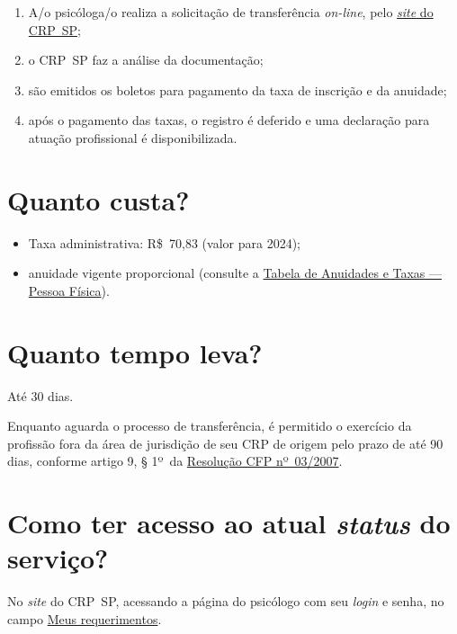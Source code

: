 \begin{enumerate}
	\item
	A/o psicóloga/o realiza a solicitação de transferência \emph{on-line}, pelo \href{https://www.crpsp.org/pagina/view/337}{\emph{site} do CRP~SP};
	\item
	o CRP~SP faz a análise da documentação;
	\item
	são emitidos os boletos para pagamento da taxa de inscrição e da anuidade;
	\item
	após o pagamento das taxas, o registro é deferido e uma declaração para atuação profissional é disponibilizada.
\end{enumerate}

\section{Quanto custa?}

\begin{itemize}
	\item
	Taxa administrativa: R\$~70,83 (valor para 2024);
	\item
	anuidade vigente proporcional (consulte a \href{https://www.crpsp.org/pagina/view/206}{Tabela de Anuidades e
		Taxas --- Pessoa Física}).
\end{itemize}

\section{Quanto tempo leva?}

Até 30 dias.

Enquanto aguarda o processo de transferência, é permitido o exercício da profissão fora da área de jurisdição de seu CRP de origem pelo prazo de até 90 dias, conforme artigo 9, § 1º~da \href{https://atosoficiais.com.br/cfp/resolucao-administrativa-financeira-n-3-2007-institui-a-consolidacao-das-resolucoes-do-conselho-federal-de-psicologia?origin=instituicao&q=resolu\%C3\%A7\%C3\%A3o\%203/2007}{Resolução	CFP nº~03/2007}.

\section{Como ter acesso ao atual \emph{status} do serviço?}

No \emph{site} do CRP~SP, acessando a página do psicólogo com seu \emph{login} e senha, no campo \href{https://cfpsp.brctotal.com/crp06_servicosonline/pgsRequerimento/MeusRequerimentos.aspx}{Meus requerimentos}.

